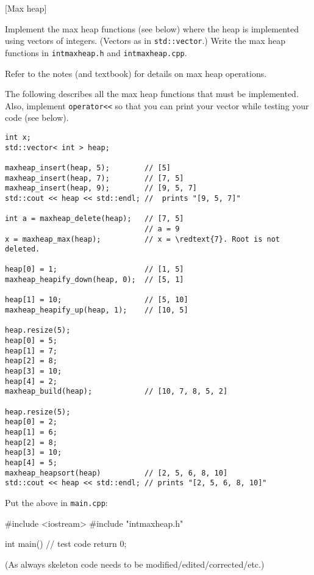 [Max heap]

Implement the max heap functions (see below)
where the heap is implemented
using vectors of integers.
(Vectors as in \texttt{std::vector}.)
Write the max heap functions in
\texttt{intmaxheap.h}
and
\texttt{intmaxheap.cpp}.

Refer to the notes (and textbook) for details
on max heap operations.

The following describes all the max heap functions that
must be implemented.
Also, implement \verb!operator<<! so that you can
print your vector while testing your code (see below).
\begin{Verbatim}[frame=single, commandchars=\\\{\}]
int x;
std::vector< int > heap;

maxheap_insert(heap, 5);        // [5]
maxheap_insert(heap, 7);        // [7, 5]
maxheap_insert(heap, 9);        // [9, 5, 7]
std::cout << heap << std::endl; //  prints "[9, 5, 7]"

int a = maxheap_delete(heap);   // [7, 5]
                                // a = 9
x = maxheap_max(heap);          // x = \redtext{7}. Root is not deleted.

heap[0] = 1;                    // [1, 5]
maxheap_heapify_down(heap, 0);  // [5, 1]

heap[1] = 10;                   // [5, 10]
maxheap_heapify_up(heap, 1);    // [10, 5]

heap.resize(5);
heap[0] = 5;
heap[1] = 7;
heap[2] = 8;
heap[3] = 10;
heap[4] = 2;
maxheap_build(heap);            // [10, 7, 8, 5, 2]

heap.resize(5);
heap[0] = 2;
heap[1] = 6;
heap[2] = 8;
heap[3] = 10;
heap[4] = 5;
maxheap_heapsort(heap)          // [2, 5, 6, 8, 10]
std::cout << heap << std::endl; // prints "[2, 5, 6, 8, 10]"
\end{Verbatim}

Put the above in \texttt{main.cpp}:
\begin{console}
#include <iostream>
#include "intmaxheap.h"

int main()
{
    // test code
    return 0;
}
\end{console}

(As always skeleton code needs to be modified/edited/corrected/etc.)
